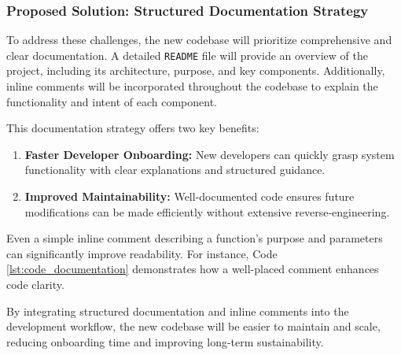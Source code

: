\subsubsection{Proposed Solution: Structured Documentation Strategy}
To address these challenges, the new codebase will prioritize comprehensive and clear documentation. A detailed \texttt{README} file will provide an overview of the project, including its architecture, purpose, and key components. Additionally, inline comments will be incorporated throughout the codebase to explain the functionality and intent of each component.

This documentation strategy offers two key benefits:
\begin{enumerate}
    \item \textbf{Faster Developer Onboarding:} New developers can quickly grasp system functionality with clear explanations and structured guidance.
    \item \textbf{Improved Maintainability:} Well-documented code ensures future modifications can be made efficiently without extensive reverse-engineering.
\end{enumerate}

Even a simple inline comment describing a function’s purpose and parameters can significantly improve readability. For instance, Code \ref{lst:code_documentation} demonstrates how a well-placed comment enhances code clarity.

By integrating structured documentation and inline comments into the development workflow, the new codebase will be easier to maintain and scale, reducing onboarding time and improving long-term sustainability.
